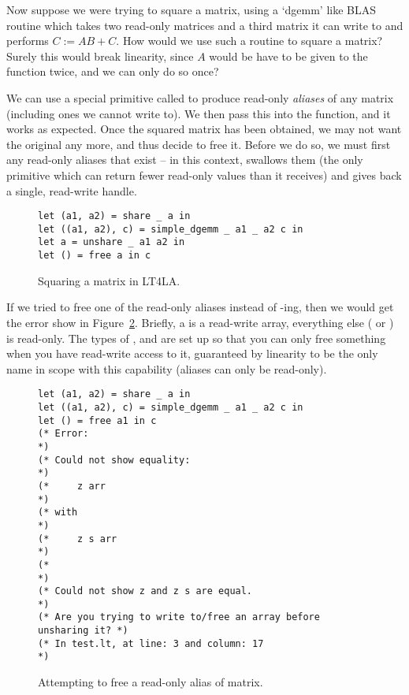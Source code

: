 Now suppose we were trying to square a matrix, using a `dgemm' like BLAS
routine which takes two read-only matrices and a third matrix it can write to
and performs $C := AB + C$. How would we use such a routine to square a matrix?
Surely this would break linearity, since $A$ would be have to be given to the
function twice, and we can only do so once?

We can use a special primitive called  to produce read-only
\emph{aliases} of any matrix (including ones we cannot write to). We then pass
this into the function, and it works as expected. Once the squared matrix has
been obtained, we may not want the original any more, and thus decide to free
it. Before we do so, we must first  any read-only aliases that
exist -- in this context,  swallows them (the only primitive
which can return fewer read-only values than it receives) and gives back a
single, read-write handle.

\begin{figure}[tp]
    \begin{verbatim}
let (a1, a2) = share _ a in
let ((a1, a2), c) = simple_dgemm _ a1 _ a2 c in
let a = unshare _ a1 a2 in
let () = free a in c
    \end{verbatim}
    \caption{Squaring a matrix in LT4LA.}\label{fig:ltfla_square}
\end{figure}

If we tried to free one of the read-only aliases instead of
-ing, then we would get the error show in
Figure~\ref{fig:ltfla_free}. Briefly, a  is a read-write array,
everything else ( or ) is read-only. The types of
, 
and  are set up so that
you can only free something when you have read-write access to it, guaranteed
by linearity to be the only name in scope with this capability (aliases can
only be read-only).

\begin{figure}[tp]
    \begin{verbatim}
let (a1, a2) = share _ a in
let ((a1, a2), c) = simple_dgemm _ a1 _ a2 c in
let () = free a1 in c
(* Error:                                                        *)
(* Could not show equality:                                      *)
(*     z arr                                                     *)
(* with                                                          *)
(*     z s arr                                                   *)
(*                                                               *)
(* Could not show z and z s are equal.                           *)
(* Are you trying to write to/free an array before unsharing it? *)
(* In test.lt, at line: 3 and column: 17                         *)
    \end{verbatim}
    \caption{Attempting to free a read-only alias of matrix.}\label{fig:ltfla_free}
\end{figure}

